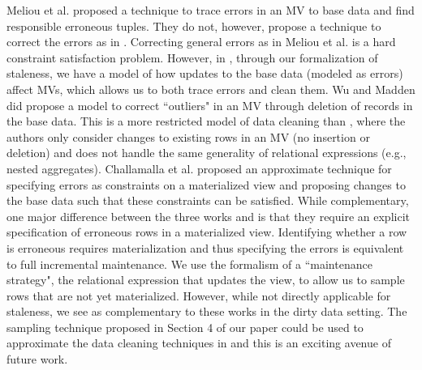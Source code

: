 Meliou et al. \cite{DBLP:conf/sigmod/MeliouGNS11} proposed a technique to trace errors in an MV to base data and find responsible erroneous tuples. 
They do not, however, propose a technique to correct the errors as in \svc.
Correcting general errors as in Meliou et al. is a hard constraint satisfaction problem.
However, in \svc, through our formalization of staleness, we have a model of how updates to the base data (modeled as errors) affect MVs, which allows us to both trace errors and clean them.
Wu and Madden \cite{DBLP:journals/pvldb/0002M13} did propose a model to correct ``outliers" in an MV through deletion of records in the base data.
This is a more restricted model of data cleaning than \svc, where the authors only consider changes to existing rows in an MV (no insertion or deletion) and does not handle the same generality of relational expressions (e.g., nested aggregates).
Challamalla et al. \cite{DBLP:conf/sigmod/ChalamallaIOP14} proposed an approximate technique for specifying errors as constraints on a materialized view and proposing changes to the base data such that these constraints can be satisfied.
While complementary, one major difference between the three works \cite{DBLP:conf/sigmod/MeliouGNS11, DBLP:journals/pvldb/0002M13, DBLP:conf/sigmod/ChalamallaIOP14} and \svc is that they require an explicit specification of erroneous rows in a materialized view.
Identifying whether a row is erroneous requires materialization and thus specifying the errors is equivalent to full incremental maintenance. 
We use the formalism of a ``maintenance strategy", the relational expression that updates the view, to allow us to sample rows that are not yet materialized.
However, while not directly applicable for staleness, we see \svc as complementary to these works in the dirty data setting. 
The sampling technique proposed in Section 4 of our paper could be used to approximate the data cleaning techniques in \cite{DBLP:conf/sigmod/MeliouGNS11, DBLP:journals/pvldb/0002M13, DBLP:conf/sigmod/ChalamallaIOP14} and this is an exciting avenue of future work.



